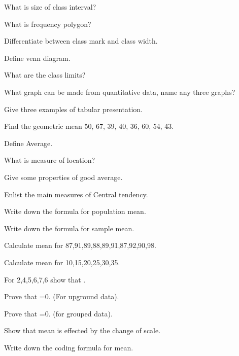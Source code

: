 \documentclass[11pt,a4paper]{article}
\begin{document}
\begin{shortlist}
\item What is size of class interval?

\item What is frequency polygon?

\item Differentiate between class mark and class width.

\item Define venn diagram.

\item What are the class limits?

\item What graph can be made from quantitative data, name any three graphs?

\item Give three examples of tabular presentation.

\item Find the geometric mean 50, 67, 39, 40, 36, 60, 54, 43.

\item Define Average.

\item What is measure of location?

\item Give some properties of good average.

\item Enlist the main measures of Central tendency.

\item Write down the formula for population mean.

\item Write down the formula for sample mean.

\item Calculate mean for 87,91,89,88,89,91,87,92,90,98.

\item Calculate mean for 10,15,20,25,30,35.

\item For 2,4,5,6,7,6 show that .

\item Prove that =0. (For upground data).

\item Prove that =0. (for grouped data).

\item Show that mean is effected by the change of scale.

\item Write down the coding formula for mean.


\end{shortlist}
\end{document}
